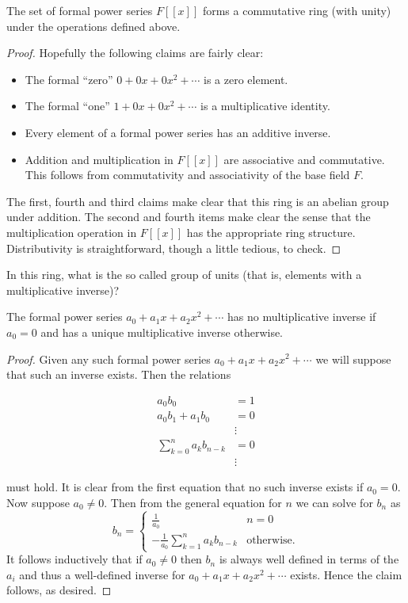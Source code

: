 \begin{proposition}
The set of formal power series $F[[x]]$ forms a commutative ring (with unity) under the operations defined above.
\end{proposition}
\begin{proof}
Hopefully the following claims are fairly clear:
\begin{itemize}
	\item The formal ``zero'' $0 + 0x + 0x^2 + \cdots$ is a zero element.
	\item The formal ``one'' $1 + 0x + 0x^2 + \cdots$ is a multiplicative identity.
	\item Every element of a formal power series has an additive inverse.
	\item Addition and multiplication in $F[[x]]$ are associative and commutative. This follows from commutativity and associativity of the base field $F$.
\end{itemize}

The first, fourth and third claims make clear that this ring is an abelian group under addition. The second and fourth items make clear the sense that the multiplication operation in $F[[x]]$ has the appropriate ring structure. Distributivity is straightforward, though a little tedious, to check.
\end{proof}

In this ring, what is the so called group of units (that is, elements with a multiplicative inverse)?
\begin{proposition}
The formal power series $a_0 + a_1x + a_2x^2 + \cdots$ has no multiplicative inverse if $a_0 = 0$ and has a unique multiplicative inverse otherwise.
\end{proposition}
\begin{proof}
Given any such formal power series $a_0 + a_1x + a_2x^2 + \cdots$ we will suppose that such an inverse exists. Then the relations

\begin{align*}
	a_0b_0 &= 1 \\
	a_0b_1 + a_1b_0 &= 0 \\
	&\vdots \\
	\sum_{k = 0}^{n}a_kb_{n-k} &= 0 \\
	&\vdots
\end{align*}

must hold. It is clear from the first equation that no such inverse exists if $a_0 = 0$. Now suppose $a_0 \neq 0$. Then from the general equation for $n$ we can solve for $b_n$ as 
\[b_n = \begin{cases}\frac{1}{a_0} & n = 0 \\ -\frac{1}{a_0}\sum_{k = 1}^na_kb_{n-k} & \text{otherwise.}\end{cases}\]
It follows inductively that if $a_0 \neq 0$ then $b_n$ is always well defined in terms of the $a_i$ and thus a well-defined inverse for $a_0 + a_1x + a_2x^2 + \cdots$ exists. Hence the claim follows, as desired.
\end{proof}

